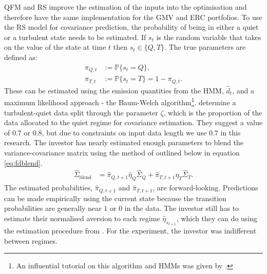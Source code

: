 \documentclass[
]{article}
\begin{document}
QFM and RS improve the estimation of the inputs into the optimisation and therefore have the same
implementation for the GMV and ERC portfolios. To use the RS model for covariance prediction, the
probability of being in either a quiet or a turbulent state needs to be estimated. If \(s_t\) is the
random variable that takes on the value of the state at time \(t\) then \(s_t \in \{Q, T\}\). The true
parameters are defined as:
\begin{align*}
\pi_{Q, t} &:= \mathbb{P}\{s_t = Q\}, \\
\pi_{T, t} &:= \mathbb{P}\{s_t = T\} = 1 - \pi_{Q, t}.
\end{align*}
These can be estimated using the emission quantities from the HMM, \(\hat{d}_t\), and a maximum
likelihood approach - the Baum-Welch algorithm\footnote{An influential tutorial on this algorithm and
  HMMs was given by \citet{R89}.}. \citet{K12} determine a turbulent-quiet data split through the parameter \(\zeta\),
which is the proportion of the data allocated to the quiet regime for covariance estimation. They
suggest a value of \(0.7\) or \(0.8\), but due to constraints on input data length we use \(0.7\) in this
research. The investor has nearly estimated enough parameters to blend the variance-covariance matrix
using the method of \citet{FD18} outlined below in equation \eqref{eq:fdblend}.
\begin{align}
\hat{\Sigma}_{\text{blend}} & = \hat{\pi}_{Q, t + 1} \hat{\eta}_Q \hat{\Sigma}_Q + \hat{\pi}_{T, t + 1} \hat{\eta}_T \hat{\Sigma}_T. \label{eq:fdblend}
\end{align}
The estimated probabilities, \(\hat{\pi}_{Q, t + 1}\) and \(\hat{\pi}_{T, t + 1}\), are forward-looking.
Predictions can be made empirically using the current state because the transition probabilities are
generally near \(1\) or \(0\) in the data. The investor still has to estimate their normalised aversion to
each regime \(\hat{\eta}_{s_{t+1}}\), which they can do using the estimation procedure from \citet{B18}. For
the experiment, the investor was indifferent between regimes.
\end{document}

